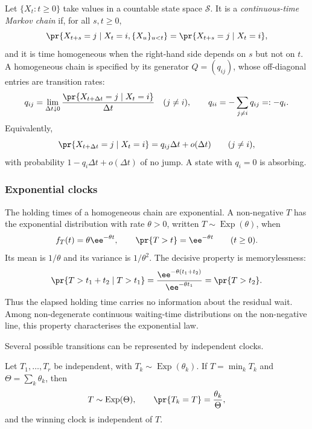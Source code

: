 Let $\{X_t:t\ge0\}$ take values in a countable state space $\mathcal S$. It
is a \emph{continuous-time Markov chain} if, for all $s,t\ge0$,
\begin{equation}
\label{m:eq:markov}
\pr{X_{t+s}=j\mid X_t=i,\{X_u\}_{u<t}}
=\pr{X_{t+s}=j\mid X_t=i},
\end{equation}
and it is time homogeneous when the right-hand side depends on $s$ but not
on $t$. A homogeneous chain is specified by its generator $Q=(q_{ij})$,
whose off-diagonal entries are transition rates:
\begin{equation}
\label{m:eq:generator}
q_{ij}=\lim_{\Delta t\downarrow0}
\frac{\pr{X_{t+\Delta t}=j\mid X_t=i}}{\Delta t}\quad(j\ne i),
\qquad
q_{ii}=-\sum_{j\ne i}q_{ij}=:-q_i.
\end{equation}
Equivalently,
\begin{equation}
\label{m:eq:infinitesimal}
\pr{X_{t+\Delta t}=j\mid X_t=i}
=q_{ij}\Delta t+o(\Delta t)\qquad(j\ne i),
\end{equation}
with probability $1-q_i\Delta t+o(\Delta t)$ of no jump. A state with
$q_i=0$ is absorbing.

\subsubsection{Exponential clocks}
\label{m:sec:exp}

The holding times of a homogeneous chain are exponential. A non-negative
\rv{} $T$ has the exponential distribution with rate $\theta>0$, written
$T\sim\operatorname{Exp}(\theta)$, when
\begin{equation}
\label{m:eq:expdef}
f_T(t)=\theta\ee^{-\theta t},
\qquad
\pr{T>t}=\ee^{-\theta t}
\qquad(t\ge0).
\end{equation}
Its mean is $1/\theta$ and its variance is $1/\theta^2$. The decisive
property is memorylessness:
\begin{equation}
\label{m:eq:memoryless}
\pr{T>t_1+t_2\mid T>t_1}
=\frac{\ee^{-\theta(t_1+t_2)}}{\ee^{-\theta t_1}}
=\pr{T>t_2}.
\end{equation}
Thus the elapsed holding time carries no information about the residual
wait. Among non-degenerate continuous waiting-time distributions on the
non-negative line, this property characterises the exponential law.

Several possible transitions can be represented by independent clocks.

\begin{proposition}
\label{m:prop:race}
Let $T_1,\ldots,T_r$ be independent, with
$T_k\sim\operatorname{Exp}(\theta_k)$. If
$T=\min_kT_k$ and $\Theta=\sum_k\theta_k$, then
\begin{equation}
\label{m:eq:race}
T\sim\operatorname{Exp}(\Theta),
\qquad
\pr{T_k=T}=\frac{\theta_k}{\Theta},
\end{equation}
and the winning clock is independent of $T$.
\end{proposition}

